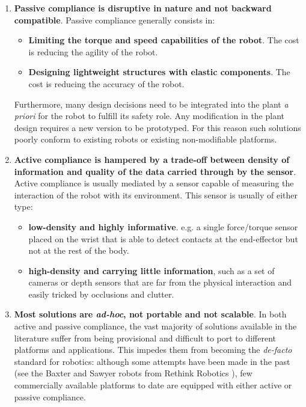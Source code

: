 \begin{enumerate}
    \item{\textbf{Passive compliance is disruptive in nature and not backward compatible}}. Passive compliance
generally consists in:
    \begin{itemize}
        \item \textbf{Limiting the torque and speed capabilities of the robot}. The cost is reducing the agility of the robot.
        \item \textbf{Designing lightweight structures with elastic components}. The cost is reducing the accuracy of the robot.
    \end{itemize}

Furthermore, many design decisions need to be integrated into the plant \textit{a priori} for the
robot to fulfill its safety role. Any modification in the plant design requires a new version to be prototyped. For this reason such solutions poorly conform to existing robots or existing non-modifiable platforms.
    \item{\textbf{Active compliance is hampered by a trade-off between density of information and quality of the
data carried through by the sensor}}. Active compliance is usually mediated by a sensor capable of measuring
the interaction of the robot with its environment. This sensor is usually of either type:
        \begin{itemize}
            \item \textbf{low-density and highly informative}. e.g. a single force/torque sensor placed on the wrist that is able to detect contacts at the end-effector but
not at the rest of the body.
            \item \textbf{high-density and carrying little information}, such as a set of cameras or depth
sensors that are far from the physical interaction and easily tricked by occlusions and clutter.
        \end{itemize}

    \item{\textbf{Most solutions are \textit{ad-hoc}, not portable and not scalable}}. In both active and passive compliance, the vast majority of
solutions available in the literature suffer from being provisional and difficult to port to different platforms
and applications. This impedes them from becoming the \textit{de-facto} standard for robotics: although some
attempts have been made in the past (see the Baxter and Sawyer robots from Rethink Robotics \cite{rethinkrobotics}), few
commercially available platforms to date are equipped with either active or passive compliance.
\end{enumerate}

